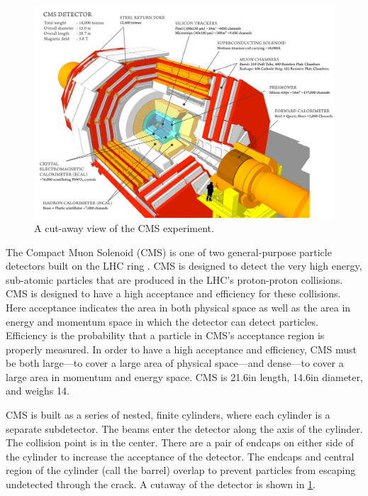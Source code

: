 \begin{figure}[!htbp]
    \centering
    \includegraphics[width=\textwidth]{figures/cms_cutaway.pdf}
    \caption{
        A cut-away view of the CMS experiment.
    }
    \label{fig:cms_cutaway}
\end{figure}

The Compact Muon Solenoid (CMS) is one of two general-purpose particle
detectors built on the LHC ring \cite{cms_tdr_1}\cite{cms_tdr_2}. CMS is
designed to detect the very high energy, sub-atomic particles that are produced
in the LHC's proton-proton collisions. CMS is designed to have a high
acceptance and efficiency for these collisions. Here acceptance indicates the
area in both physical space as well as the area in energy and momentum space in
which the detector can detect particles. Efficiency is the probability that a
particle in CMS's acceptance region is properly measured. In order to have a
high acceptance and efficiency, CMS must be both large---to cover a large area
of physical space---and dense---to cover a large area in momentum and energy
space. CMS is 21.6\meters in length, 14.6\meters in diameter, and weighs
14\kilotonne.

CMS is built as a series of nested, finite cylinders, where each cylinder is a
separate subdetector. The beams enter the detector along the axis of the
cylinder. The collision point is in the center. There are a pair of endcaps on
either side of the cylinder to increase the acceptance of the detector. The
endcaps and central region of the cylinder (call the barrel) overlap to prevent
particles from escaping undetected through the crack. A cutaway of the detector
is shown in \cref{fig:cms_cutaway}.

